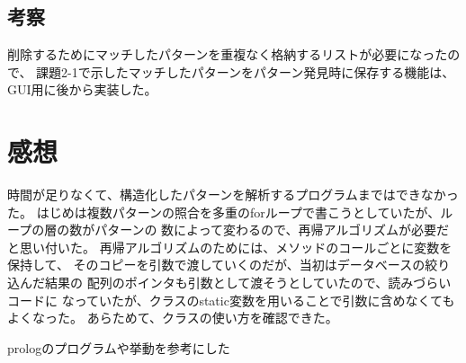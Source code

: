 \documentclass{jarticle}
\begin{document}
\subsection{考察}
削除するためにマッチしたパターンを重複なく格納するリストが必要になったので、
課題2-1で示したマッチしたパターンをパターン発見時に保存する機能は、GUI用に後から実装した。

\section{感想}
時間が足りなくて、構造化したパターンを解析するプログラムまではできなかった。
はじめは複数パターンの照合を多重のforループで書こうとしていたが、ループの層の数がパターンの
数によって変わるので、再帰アルゴリズムが必要だと思い付いた。
再帰アルゴリズムのためには、メソッドのコールごとに変数を保持して、
そのコピーを引数で渡していくのだが、当初はデータベースの絞り込んだ結果の
配列のポインタも引数として渡そうとしていたので、読みづらいコードに
なっていたが、クラスのstatic変数を用いることで引数に含めなくてもよくなった。
あらためて、クラスの使い方を確認できた。

\begin{thebibliography}{99}
     prologのプログラムや挙動を参考にした
\end{thebibliography}
\end{document}
